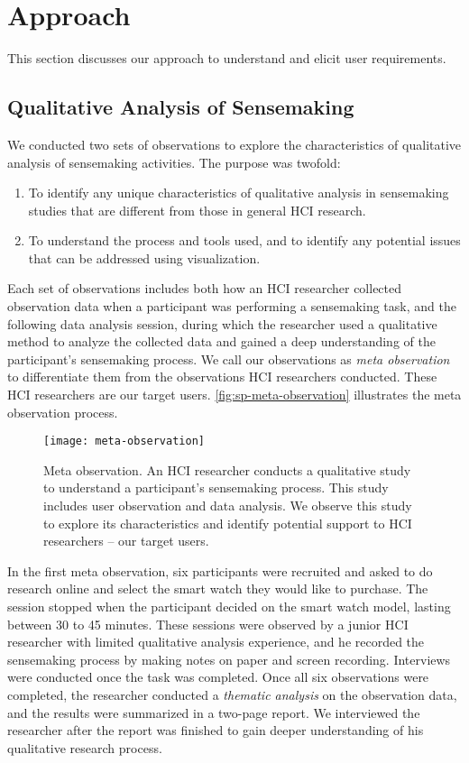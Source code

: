 \section{Approach}
This section discusses our approach to understand and elicit user requirements.

\subsection{Qualitative Analysis of Sensemaking}
We conducted two sets of observations to explore the characteristics of qualitative analysis of sensemaking activities. The purpose was twofold:
\begin{enumerate}
	\item To identify any unique characteristics of qualitative analysis in sensemaking studies that are different from those in general HCI research.
	\item To understand the process and tools used, and to identify any potential issues that can be addressed using visualization.
\end{enumerate}

Each set of observations includes both how an HCI researcher collected observation data when a participant was performing a sensemaking task, and the following data analysis session, during which the researcher used a qualitative method to analyze the collected data and gained a deep understanding of the participant's sensemaking process. We call our observations as \emph{meta observation} to differentiate them from the observations HCI researchers conducted. These HCI researchers are our target users. \autoref{fig:sp-meta-observation} illustrates the meta observation process.

\begin{figure}
 	\centering
 	\texttt{[image: meta-observation]}
 	\caption[Meta observation]{Meta observation. An HCI researcher conducts a qualitative study to understand a participant's sensemaking process. This study includes user observation and data analysis. We observe this study to explore its characteristics and identify potential support to HCI researchers -- our target users.}
 	\label{fig:sp-meta-observation}
\end{figure}

In the first meta observation, six participants were recruited and asked to do research online and select the smart watch they would like to purchase. The session stopped when the participant decided on the smart watch model, lasting between 30 to 45 minutes. These sessions were observed by a junior HCI researcher with limited qualitative analysis experience, and he recorded the sensemaking process by making notes on paper and screen recording. Interviews were conducted once the task was completed. Once all six observations were completed, the researcher conducted a \emph{thematic analysis} on the observation data, and the results were summarized in a two-page report. We interviewed the researcher after the report was finished to gain deeper understanding of his qualitative research process.

